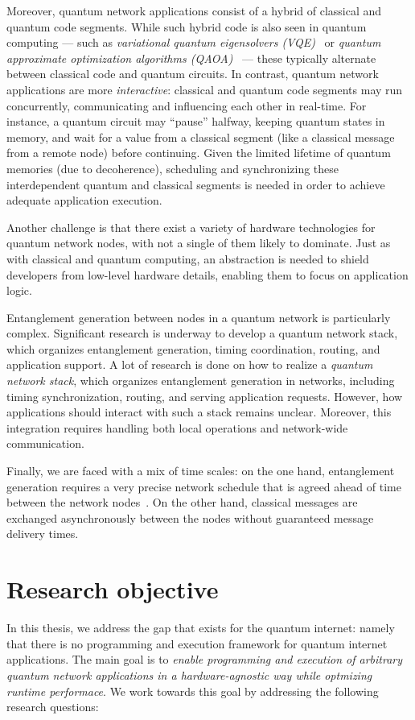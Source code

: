 Moreover, quantum network applications consist of a hybrid of classical and quantum code segments.
While such hybrid code is also seen in quantum computing --- such as \textit{variational quantum eigensolvers (VQE)}~\cite{diadamo2021distributed, liu2022layer} or \textit{quantum approximate optimization algorithms (QAOA)}~\cite{farhi2014quantum} ---
these typically alternate between classical code and quantum circuits.
In contrast, quantum network applications are more \textit{interactive}: classical and quantum code segments may run concurrently, communicating and influencing each other in real-time.
For instance, a quantum circuit may ``pause'' halfway, keeping quantum states in memory, and wait for a value from a classical segment (like a classical message from a remote node) before continuing.
Given the limited lifetime of quantum memories (due to decoherence), scheduling and synchronizing these interdependent quantum and classical segments is needed in order to achieve adequate application execution.


Another challenge is that there exist a variety of hardware technologies for quantum network nodes, with not a single of them likely to dominate.
Just as with classical and quantum computing, an abstraction is needed to shield developers from low-level hardware details, enabling them to focus on application logic.

Entanglement generation between nodes in a quantum network is particularly complex.
Significant research is underway to develop a quantum network stack, which organizes entanglement generation, timing coordination, routing, and application support.
A lot of research is done on how to realize a \emph{quantum network stack}, which organizes entanglement generation in networks, including timing synchronization, routing, and serving application requests.
However, how applications should interact with such a stack remains unclear.
Moreover, this integration requires handling both local operations and network-wide communication.

Finally, we are faced with a mix of time scales: on the one hand, entanglement generation requires a very precise network schedule that is agreed ahead of time between the network nodes~\cite{dahlberg2019link}.
On the other hand, classical messages are exchanged asynchronously between the nodes without guaranteed message delivery times.




\section{Research objective}
In this thesis, we address the gap that exists for the quantum internet: namely that there is no programming and execution framework for quantum internet applications.
The main goal is to \emph{enable programming and execution of arbitrary quantum network applications in a hardware-agnostic way while optmizing runtime performace}.
We work towards this goal by addressing the following research questions:

